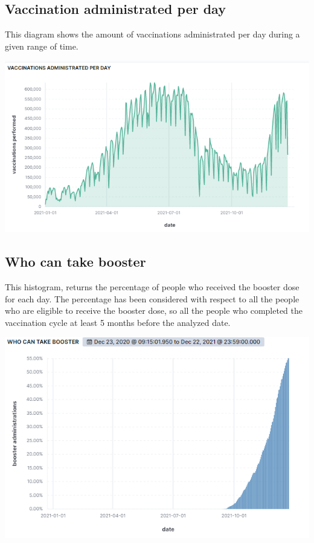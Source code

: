 \documentclass{article}
\begin{document}
\subsection{Vaccination administrated per day}
This diagram shows the amount of vaccinations administrated per day during a given range of time.

\begin{center}
\includegraphics[scale=0.6]{vacc_adm_per_day.png}
\end{center}

\subsection{Who can take booster}
This histogram, returns the percentage of people who received the booster dose for each day. The percentage has been considered with respect to all the people who are eligible to receive the booster dose, so all the people who completed the vaccination cycle at least 5 months before the analyzed date.

\begin{center}
\includegraphics[scale=1.2]{who_booster.png}
\end{center}
\end{document}
